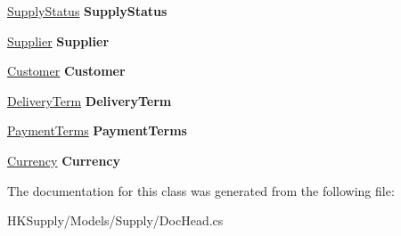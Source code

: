 \begin{DoxyCompactItemize}
\mbox{\hyperlink{class_h_k_supply_1_1_models_1_1_supply_1_1_supply_status}{Supply\+Status}} {\bfseries Supply\+Status}
\item 
\mbox{\label{class_h_k_supply_1_1_models_1_1_supply_1_1_doc_head_a761aa21f82464901c186b2a4864bb0e3}} 
\mbox{\hyperlink{class_h_k_supply_1_1_models_1_1_supplier}{Supplier}} {\bfseries Supplier}
\item 
\mbox{\label{class_h_k_supply_1_1_models_1_1_supply_1_1_doc_head_a70f7ca3f3b82c41bfb8bef3b5b38fc3f}} 
\mbox{\hyperlink{class_h_k_supply_1_1_models_1_1_customer}{Customer}} {\bfseries Customer}
\item 
\mbox{\label{class_h_k_supply_1_1_models_1_1_supply_1_1_doc_head_a79e9eaed17b58a1d2afca5f8611ebc4b}} 
\mbox{\hyperlink{class_h_k_supply_1_1_models_1_1_delivery_term}{Delivery\+Term}} {\bfseries Delivery\+Term}
\item 
\mbox{\label{class_h_k_supply_1_1_models_1_1_supply_1_1_doc_head_a6a55b66f22eaba657376a88f7e8ecce1}} 
\mbox{\hyperlink{class_h_k_supply_1_1_models_1_1_payment_terms}{Payment\+Terms}} {\bfseries Payment\+Terms}
\item 
\mbox{\label{class_h_k_supply_1_1_models_1_1_supply_1_1_doc_head_ae8be369d18356d5df211a7e5bce350bb}} 
\mbox{\hyperlink{class_h_k_supply_1_1_models_1_1_currency}{Currency}} {\bfseries Currency}
\end{DoxyCompactItemize}


The documentation for this class was generated from the following file\+:\begin{DoxyCompactItemize}
\item 
H\+K\+Supply/\+Models/\+Supply/Doc\+Head.\+cs\end{DoxyCompactItemize}
